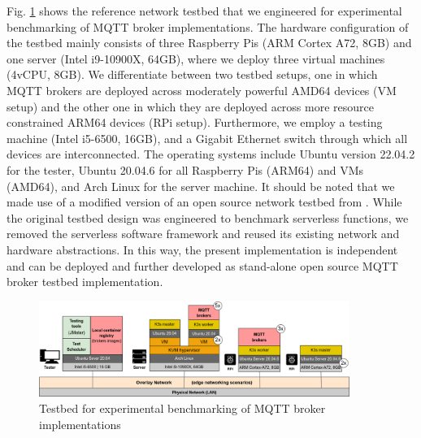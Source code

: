 \documentclass[conference]{IEEEtran}
\begin{document}
Fig. \ref{fig:testbed} shows the reference network testbed that we engineered for experimental
benchmarking of MQTT broker implementations. The hardware configuration of the testbed mainly
consists of three Raspberry Pis (ARM Cortex A72, 8GB) and one server (Intel i9-10900X, 64GB), where
we deploy three virtual machines (4vCPU, 8GB). We differentiate between two testbed setups, one in
which MQTT brokers are deployed across moderately powerful AMD64 devices (VM setup) and the other
one in which they are deployed across more resource constrained ARM64 devices (RPi setup).
Furthermore, we employ a testing machine  (Intel i5-6500, 16GB), and a Gigabit Ethernet switch
through which all devices are interconnected.  The operating systems include Ubuntu version 22.04.2
for the tester, Ubuntu 20.04.6 for all Raspberry Pis (ARM64) and VMs (AMD64), and Arch Linux for the
server machine. It should be noted that we made use of a modified version of an open source
network testbed from  \cite{carpio2022benchfaas}. While the original testbed design was
engineered to benchmark serverless functions, we removed the serverless software framework and
reused its existing network and hardware abstractions. In this way, the present implementation
is independent and can be deployed and further developed as stand-alone open source MQTT broker testbed implementation.

\begin{figure}[htbp]
\centering
\hspace*{-0.7cm}\includegraphics[width=0.9\textwidth]{testbed1.png}
\vspace{-0.3cm}
\caption{\label{fig:testbed}Testbed for experimental benchmarking of MQTT broker implementations}
\end{figure}
\end{document}
